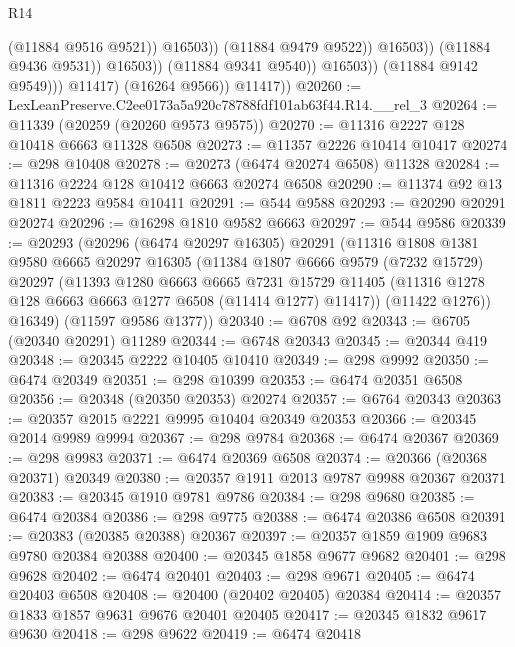 \begin{lexlean}{R14}
\begin{coremodule}
                                        (@11884 @9516 @9521))
                                      @16503))
                                  (@11884 @9479 @9522))
                                @16503))
                            (@11884 @9436 @9531))
                          @16503))
                      (@11884 @9341 @9540))
                    @16503))
                (@11884 @9142 @9549)))
            @11417)
          (@16264 @9566))
        @11417))
@20260 := LexLeanPreserve.C2ee0173a5a920c78788fdf101ab63f44.R14.__rel_3
@20264 := @11339 (@20259 (@20260 @9573 @9575))
@20270 := @11316 @2227 @128 @10418 @6663 @11328 @6508
@20273 := @11357 @2226 @10414 @10417
@20274 := @298 @10408
@20278 := @20273 (@6474 @20274 @6508) @11328
@20284 := @11316 @2224 @128 @10412 @6663 @20274 @6508
@20290 := @11374 @92 @13 @1811 @2223 @9584 @10411
@20291 := @544 @9588
@20293 := @20290 @20291 @20274
@20296 := @16298 @1810 @9582 @6663
@20297 := @544 @9586
@20339 := @20293
    (@20296
      (@6474 @20297 @16305)
      @20291
      (@11316
        @1808
        @1381
        @9580
        @6665
        @20297
        @16305
        (@11384
          @1807
          @6666
          @9579
          (@7232 @15729)
          @20297
          (@11393
            @1280
            @6663
            @6665
            @7231
            @15729
            @11405
            (@11316 @1278 @128 @6663 @6663 @1277 @6508 (@11414 @1277) @11417))
          (@11422 @1276))
        @16349)
      (@11597 @9586 @1377))
@20340 := @6708 @92
@20343 := @6705 (@20340 @20291) @11289
@20344 := @6748 @20343
@20345 := @20344 @419
@20348 := @20345 @2222 @10405 @10410
@20349 := @298 @9992
@20350 := @6474 @20349
@20351 := @298 @10399
@20353 := @6474 @20351 @6508
@20356 := @20348 (@20350 @20353) @20274
@20357 := @6764 @20343
@20363 := @20357 @2015 @2221 @9995 @10404 @20349 @20353
@20366 := @20345 @2014 @9989 @9994
@20367 := @298 @9784
@20368 := @6474 @20367
@20369 := @298 @9983
@20371 := @6474 @20369 @6508
@20374 := @20366 (@20368 @20371) @20349
@20380 := @20357 @1911 @2013 @9787 @9988 @20367 @20371
@20383 := @20345 @1910 @9781 @9786
@20384 := @298 @9680
@20385 := @6474 @20384
@20386 := @298 @9775
@20388 := @6474 @20386 @6508
@20391 := @20383 (@20385 @20388) @20367
@20397 := @20357 @1859 @1909 @9683 @9780 @20384 @20388
@20400 := @20345 @1858 @9677 @9682
@20401 := @298 @9628
@20402 := @6474 @20401
@20403 := @298 @9671
@20405 := @6474 @20403 @6508
@20408 := @20400 (@20402 @20405) @20384
@20414 := @20357 @1833 @1857 @9631 @9676 @20401 @20405
@20417 := @20345 @1832 @9617 @9630
@20418 := @298 @9622
@20419 := @6474 @20418

\end{coremodule}
\end{lexlean}
